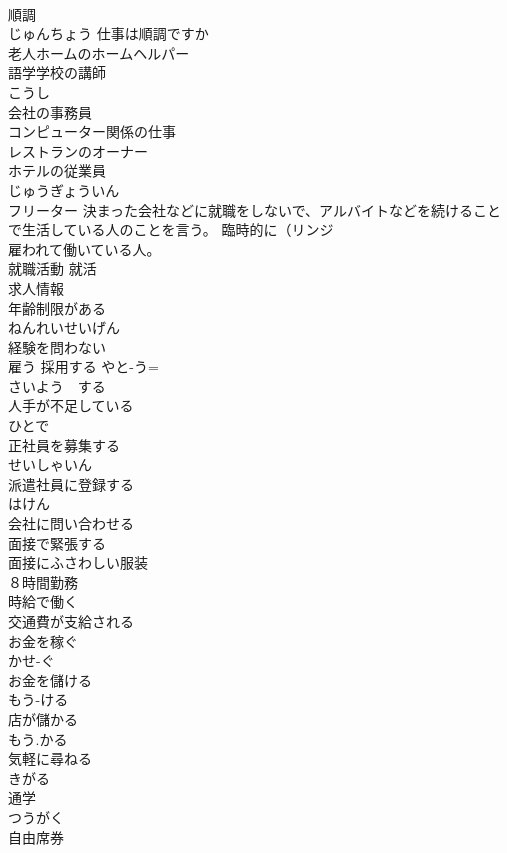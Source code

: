 \documentclass[8pt]{extreport}
\begin{document}
\begin{CJK}{UTF8}{min}
\\	順調	
\\	じゅんちょう 仕事は順調ですか
\\	老人ホームのホームヘルパー	
\\	語学学校の講師	
\\	こうし
\\	会社の事務員	
\\	コンピューター関係の仕事	
\\	レストランのオーナー	
\\	ホテルの従業員	
\\	じゅうぎょういん
\\	フリーター	決まった会社などに就職をしないで、アルバイトなどを続けることで生活している人のことを言う。 臨時的に（リンジ　
\\	雇われて働いている人。 
\\	就職活動 就活	
\\	求人情報	
\\	年齢制限がある	
\\	ねんれいせいげん
\\	経験を問わない	
\\	雇う 採用する	やと-う=
\\	さいよう　する 
\\	人手が不足している	
\\	ひとで
\\	正社員を募集する	
\\	せいしゃいん
\\	派遣社員に登録する	
\\	はけん
\\	会社に問い合わせる	
\\	面接で緊張する	
\\	面接にふさわしい服装	
\\	８時間勤務	
\\	時給で働く	
\\	交通費が支給される	
\\	お金を稼ぐ	
\\	かせ-ぐ
\\	お金を儲ける	
\\	もう-ける
\\	店が儲かる	
\\	もう.かる
\\	気軽に尋ねる	
\\	きがる
\\	通学	
\\	つうがく
\\	自由席券	

\end{CJK}
\end{document}
